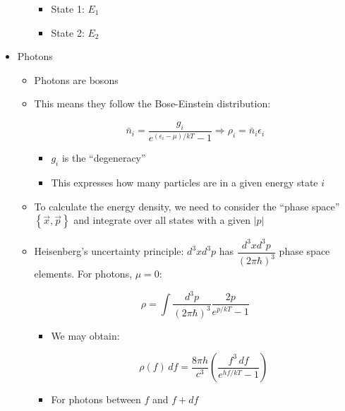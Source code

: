 \begin{itemize}
\begin{itemize}
        \begin{itemize}

          \item State 1: $E_1$

          \item State 2: $E_2$

        \end{itemize}

    \end{itemize}

  \item Photons

    \begin{itemize}

      \item Photons are bosons

      \item This means they follow the Bose-Einstein distribution:

        $$\bar{n}_i=\frac{g_i}{e^{(\epsilon_i-\mu)/kT}-1}\Rightarrow \rho_i=\bar{n}_i\epsilon_i$$

        \begin{itemize}

          \item $g_i$ is the ``degeneracy''

          \item This expresses how many particles are in a given energy state $i$

        \end{itemize}

      \item To calculate the energy density, we need to consider the ``phase space'' $\left\{ \vec{x},\vec{p} \right\}$ and integrate over all states with a given $|p|$

      \item Heisenberg's uncertainty principle: $d^3xd^3p$ has $\dfrac{d^3xd^3p}{(2\pi\hbar)^3}$ phase space elements. For photons, $\mu=0$:

        $$\rho=\int\frac{d^3p}{(2\pi\hbar)^3}\frac{2p}{e^{p/kT}-1}$$

        \begin{itemize}

          \item We may obtain:

            $$\rho(f)\,df=\frac{8\pi h}{c^3}\left( \frac{f^3\,df}{e^{hf/kT}-1} \right)$$

            \item For photons between $f$ and $f+df$


\end{itemize}
\end{itemize}
\end{itemize}
